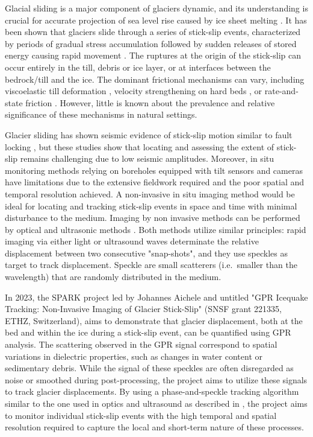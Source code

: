 Glacial sliding is a major component of glaciers dynamic, and its understanding is crucial for accurate projection of sea level rise caused by ice sheet melting \citep{Ritz&al2015}. It has been shown that glaciers slide through a series of stick-slip events, characterized by periods of gradual stress accumulation followed by sudden releases of stored energy causing rapid movement \citep{Walter&al2011,Podolskiy&al2016,Grab&al2021}. The ruptures at the origin of the stick-slip can occur entirely in the till, debris or ice layer, or at interfaces between the bedrock/till and the ice. The dominant frictional mechanisms can vary, including viscoelastic till deformation \citep{Tulaczyk&al1999}, velocity strengthening on hard beds \citep{Guerin&al2021}, or rate-and-state friction \citep{Zoet&al2020}. However, little is known about the prevalence and relative significance of these mechanisms in natural settings. 

Glacier sliding has shown seismic evidence of stick-slip motion similar to fault locking \citep{Podolskiy&al2016,Graff&Walter2021}, but these studies show that locating and assessing the extent of stick-slip remains challenging due to low seismic amplitudes. Moreover, in situ monitoring methods relying on boreholes equipped with tilt sensors and cameras have limitations due to the extensive fieldwork required and the poor spatial and temporal resolution achieved. A non-invasive in situ imaging method would be ideal for locating and tracking stick-slip events in space and time with minimal disturbance to the medium. Imaging by non invasive methods can be performed by optical \citep[e.g.][]{Rubino&al2020,Steinhardt&al2022} and ultrasonic methods \citep[e.g.][]{Latour&al2011,Aichele&al2023}. Both methods utilize similar principles: rapid imaging via either light or ultrasound waves determinate the relative displacement between two consecutive "snap-shots", and they use speckles as target to track displacement. Speckle are small scatterers (i.e.\ smaller than the wavelength) that are randomly distributed in the medium. 

In 2023, the SPARK project led by Johannes Aichele and untitled "GPR Icequake Tracking: Non-Invasive Imaging of Glacier Stick-Slip" (SNSF grant 221335, ETHZ, Switzerland), aims to demonstrate that glacier displacement, both at the bed and within the ice during a stick-slip event, can be quantified using GPR analysis. The scattering observed in the GPR signal correspond to spatial variations in dielectric properties, such as changes in water content or sedimentary debris. While the signal of these speckles are often disregarded as noise or smoothed during post-processing, the project aims to utilize these signals to track glacier displacements. By using a phase-and-speckle tracking algorithm similar to the one used in optics and ultrasound as described in \cite{Aichele2019}, the project aims to monitor individual stick-slip events with the high temporal and spatial resolution required to capture the local and short-term nature of these processes.

